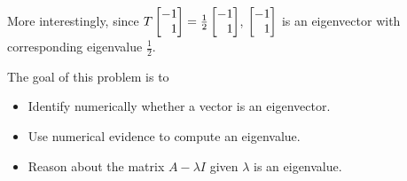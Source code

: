 \documentclass{workbook}
\newcommand{\bookonlynewpage}{\begin{bookonly}\newpage\end{bookonly}}
\begin{document}
\begin{slide}
\begin{parts}
\begin{solution}
				More interestingly, since $T\mat{-1\\1}=\frac{1}{2}\mat{-1\\1}$,
				$\mat{-1\\1}$ is an eigenvector with corresponding eigenvalue
				$\frac{1}{2}$.
			\end{solution}
	\end{parts}

\end{slide}
\begin{slide}

	\bookonlynewpage
	\question
	\begin{annotation}
		\begin{goals}

			The goal of this problem is to
			\begin{itemize}
				\item Identify numerically whether a vector is an eigenvector.
				\item Use numerical evidence to compute an eigenvalue.
				\item Reason about the matrix $A-\lambda I$ given $\lambda$ is an eigenvalue.
			\end{itemize}
		\end{goals}


\end{annotation}
\end{slide}
\end{document}
